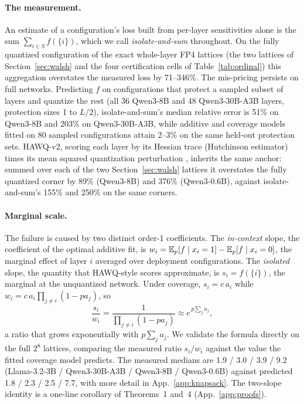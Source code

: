 \paragraph{The measurement.} An estimate of a configuration's loss built from per-layer sensitivities
alone is the sum $\sum_{i\in S} f(\{i\})$, which we call \emph{isolate-and-sum} throughout. 
 On the fully quantized configuration of the
exact whole-layer FP4 lattices (the two lattices of Section~\ref{sec:walsh} and the four
certification cells of Table~\ref{tab:ordinal}) this aggregation overstates the measured loss by
71--346\%. The mis-pricing persists on full networks. Predicting $f$ on
configurations that protect a sampled subset of layers and quantize the rest (all 36 Qwen3-8B and 48
Qwen3-30B-A3B layers, protection sizes 1 to
$L/2$), isolate-and-sum's median relative error is
51\% on Qwen3-8B and 203\% on Qwen3-30B-A3B, while additive and coverage models fitted on 80
sampled configurations attain 2--3\% on the same held-out protection sets. HAWQ-v2, scoring each layer by its Hessian trace (Hutchinson estimator) times its mean squared
quantization perturbation \citep{dong2020hawqv2}, inherits the same anchor: summed over each of the
two Section~\ref{sec:walsh} lattices it overstates the fully quantized corner by 89\% (Qwen3-8B) and
376\% (Qwen3-0.6B), against isolate-and-sum's 155\% and 250\% on the same corners.

\paragraph{Marginal scale.} The failure is caused by two distinct order-1 coefficients.
The \emph{in-context} slope, the coefficient of the optimal additive fit, is
$w_i = \mathbb{E}_p[f\mid x_i=1] - \mathbb{E}_p[f\mid x_i=0]$, the marginal effect of layer $i$ averaged over deployment
configurations. The \emph{isolated} slope, the quantity that HAWQ-style scores approximate,
is $s_i = f(\{i\})$, the marginal at the
unquantized network. Under coverage, $s_i = c\,a_i$ while $w_i = c\,a_i\prod_{j\ne i}(1-p a_j)$, so
\[
  \frac{s_i}{w_i} = \frac{1}{\prod_{j\ne i}(1-p a_j)} \approx e^{\,p\sum_j a_j},
\]
a ratio that grows exponentially with $p\sum_j a_j$. We validate the formula directly on the
full $2^8$ lattices, comparing the measured ratio $s_i/w_i$ 
against the value the fitted coverage model predicts. The measured medians are 1.9 / 3.0 / 3.9 / 9.2
(Llama-3.2-3B / Qwen3-30B-A3B / Qwen3-8B / Qwen3-0.6B) against predicted
1.8 / 2.3 / 2.5 / 7.7, with more detail in
App.~\ref{app:knapsack}. 
The two-slope identity is a one-line corollary of Theorems~1 and~4 (App.~\ref{app:proofs}).

